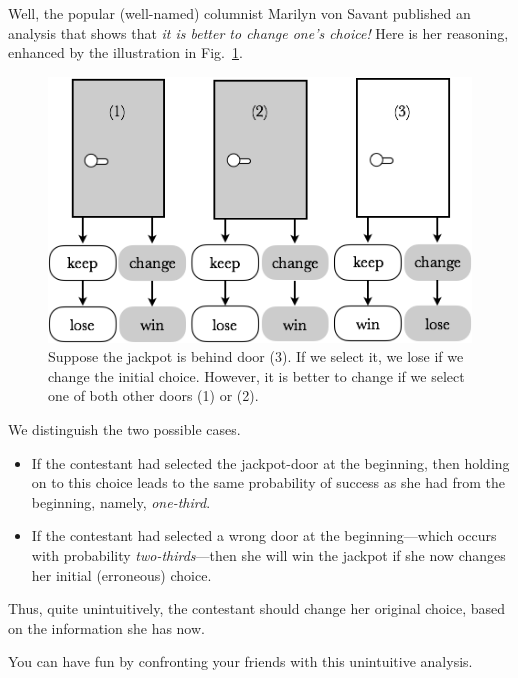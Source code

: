Well, the popular (well-named) columnist Marilyn von Savant
 published an analysis that shows that
{\em it is better to change one's choice!}  Here is her reasoning,
enhanced by the illustration in Fig.~\ref{fig:MonthyHall-2}.
\begin{figure}[htb]
\begin{center}
        \includegraphics[scale=0.4]{FiguresMaths/MonthyHall}
        \caption{Suppose the jackpot is behind door (3). 
        If we select it, we lose if we change the initial choice.
        However, it is better to change if we select one of both other doors (1) or (2).}
        \label{fig:MonthyHall-2}
\end{center}
\end{figure}
We distinguish the two possible cases.
\begin{itemize}
\item
If the contestant had selected the jackpot-door at the beginning, then
holding on to this choice leads to the same probability of success as
she had from the beginning, namely, {\em one-third}.
\item
If the contestant had selected a wrong door at the beginning---which
occurs with probability {\em two-thirds}---then she will win the
jackpot if she now changes her initial (erroneous) choice.
\end{itemize}
Thus, quite unintuitively, the contestant should change her original
choice, based on the information she has now.

\smallskip

You can have fun by confronting your friends with this unintuitive
analysis.

\medskip

